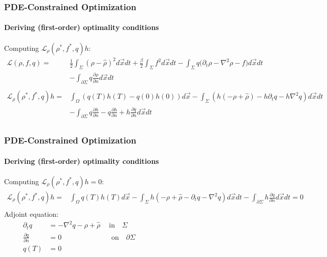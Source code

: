 \documentclass[aspectratio=169,xcolor=dvipsnames]{beamer}
\begin{document}
\begin{frame}
	\frametitle{PDE-Constrained Optimization}
	\framesubtitle{Deriving (first-order) optimality conditions}
	Computing  $\mathcal{L}_\rho (\rho^*, f^*,q)h$:
	\begin{align*}
		\mathcal{L}(\rho, f,q)=& \frac{1}{2}\int_\Sigma \left(\rho- \widehat{\rho}\right)^2 d \vec x dt + \frac{\beta}{2} \int_\Sigma f^2 d \vec x dt - \int_\Sigma q \bigg( \partial_t \rho - \nabla^2 \rho  - f \bigg) d\vec{x} dt \\
		&- \int_{\partial \Sigma} q \frac{\partial \rho}{\partial n}   d\vec{x} dt\\
		\\
		\mathcal{L}_\rho (\rho^*, f^*,q)h = & \int_\Omega \left(q(T) h(T) - q(0) h(0)\right)d \vec x  - \int_\Sigma \left(h(-\rho + \widehat \rho)  - h \partial_t q - h\nabla^2 q  \right) d\vec{x} dt \\
		&-\int_{\partial \Sigma} q \frac{\partial h}{\partial n}  - q \frac{\partial h}{\partial n} + h \frac{\partial q}{\partial n} d\vec{x} dt \\
	\end{align*}
\end{frame}
\begin{frame}
	\frametitle{PDE-Constrained Optimization}
	\framesubtitle{Deriving (first-order) optimality conditions}
	Computing  $\mathcal{L}_\rho (\rho^*, f^*,q)h = 0$:
	\begin{align*}
		\mathcal{L}_\rho (\rho^*, f^*,q)h = & \int_\Omega q(T) h(T) d \vec x  - \int_\Sigma h \left(-\rho + \widehat \rho  - \partial_t q -  \nabla^2 q  \right) d\vec{x} dt - \int_{\partial \Sigma}  h \frac{\partial q}{\partial n} d\vec{x} dt = 0\\
	\end{align*}
Adjoint equation:
\begin{align*}
	  \partial_t q &=  -  \nabla^2 q -\rho + \widehat \rho  \ \quad \text{in} \quad \Sigma \qquad \qquad\qquad\qquad\qquad\qquad\qquad\qquad\\
	  \frac{\partial q}{\partial n} &= 0 \qquad\qquad\quad\quad \quad \text{on} \quad \partial \Sigma\\
	  q(T) &=0
\end{align*}
\end{frame}
\end{document}
